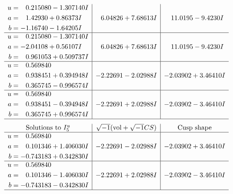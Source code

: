 \documentclass[1p]{elsarticle_modified}
\theoremstyle{definition}
\newcommand{\I}{\sqrt{-1}}
\begin{document}
$$\begin{array}{c|c|c}
\begin{aligned}
u &= \phantom{-}0.215080 - 1.307140 I \\
a &= \phantom{-}1.42930 + 0.86373 I \\
b &= -1.16740 - 1.64205 I\end{aligned}
 & \phantom{-}6.04826 + 7.68613 I & \phantom{-}11.0195 - 9.4230 I \\ \hline\begin{aligned}
u &= \phantom{-}0.215080 - 1.307140 I \\
a &= -2.04108 + 0.56107 I \\
b &= \phantom{-}0.961053 + 0.509737 I\end{aligned}
 & \phantom{-}6.04826 + 7.68613 I & \phantom{-}11.0195 - 9.4230 I \\ \hline\begin{aligned}
u &= \phantom{-}0.569840\phantom{ +0.000000I} \\
a &= \phantom{-}0.938451 + 0.394948 I \\
b &= \phantom{-}0.365745 - 0.996574 I\end{aligned}
 & -2.22691 - 2.02988 I & -2.03902 + 3.46410 I \\ \hline\begin{aligned}
u &= \phantom{-}0.569840\phantom{ +0.000000I} \\
a &= \phantom{-}0.938451 - 0.394948 I \\
b &= \phantom{-}0.365745 + 0.996574 I\end{aligned}
 & -2.22691 + 2.02988 I & -2.03902 - 3.46410 I\\
 \hline 
 \end{array}$$\newpage$$\begin{array}{c|c|c}  
\text{Solutions to }I^u_{5}& \I (\text{vol} + \sqrt{-1}CS) & \text{Cusp shape}\\
 \hline 
\begin{aligned}
u &= \phantom{-}0.569840\phantom{ +0.000000I} \\
a &= \phantom{-}0.101346 + 1.406030 I \\
b &= -0.743183 + 0.342830 I\end{aligned}
 & -2.22691 - 2.02988 I & -2.03902 + 3.46410 I \\ \hline\begin{aligned}
u &= \phantom{-}0.569840\phantom{ +0.000000I} \\
a &= \phantom{-}0.101346 - 1.406030 I \\
b &= -0.743183 - 0.342830 I\end{aligned}
 & -2.22691 + 2.02988 I & -2.03902 - 3.46410 I\\
 \hline 
 \end{array}$$\newpage\newpage\renewcommand{\arraystretch}{1}
\end{document}
